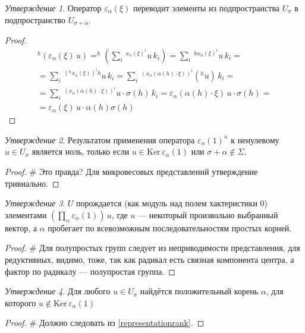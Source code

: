 \documentclass[10pt]{article}
\theoremstyle{remark}
\newtheorem{prop}{Утверждение}
\begin{document}
\begin{prop}
Оператор $\varepsilon_\alpha(\xi)$ переводит элементы из подпространства $U_\sigma$ в подпространство $U_{\sigma+\alpha}$.
\end{prop}
\begin{proof}
\begin{multline*}
^h(\varepsilon_\alpha(\xi) \, u) =
^h\left(\sum_i \, {^{x_\alpha(\xi)^i}u \, k_i}\right) = 
\sum_i \, {^{h x_\alpha(\xi)^i}u \, k_i} = \\ =
\sum_i \, {^{(^h x_\alpha(\xi))^i h}u \, k_i} = 
\sum_i \, {^{(x_\alpha(\alpha(h)\cdot\xi))^i} \left(^h u\right) \, k_i} =\\=
\sum_i \, {^{(x_\alpha(\alpha(h)\cdot\xi))^i} u \cdot \sigma(h) \, k_i} =
\varepsilon_\alpha(\alpha(h)\cdot\xi) \, u \cdot \sigma(h) = \\ =
\varepsilon_\alpha(\xi) \, u \cdot \alpha(h)\sigma(h)
\end{multline*}
\end{proof}

\begin{prop} Результатом применения оператора $\varepsilon_\alpha(1)^n$ к ненулевому $u \in U_\sigma$ является ноль, только если $u \in \mathrm{Ker}\,\varepsilon_\alpha(1)$ или $\sigma + \alpha \notin \Sigma$.
\end{prop}
\begin{proof}
\# Это правда? Для микровесовых представлений утверждение тривиально.
\end{proof}

\begin{prop}
$U$ порождается (как модуль над полем хактеристики 0) элементами $\left(\prod_{\alpha}\varepsilon_\alpha(1)\right) \, u$, где $u$ --- некоторый произвольно выбранный вектор, а $\alpha$ пробегает по всевозможным последовательностям простых корней.
\end{prop}
\begin{proof}
\# Для полупростых групп следует из неприводимости представления, для редуктивных, видимо, тоже, так как радикал есть связная компонента центра, а фактор по радикалу --- полупростая группа.
\end{proof}

\begin{prop}
Для любого $u \in U_\sigma$ найдётся положительный корень $\alpha$, для которого $u \notin \mathrm{Ker} \, \varepsilon_\alpha(1)$
\end{prop}
\begin{proof}
\# Должно следовать из \ref{representationrank}.
\end{proof}
\end{document}
